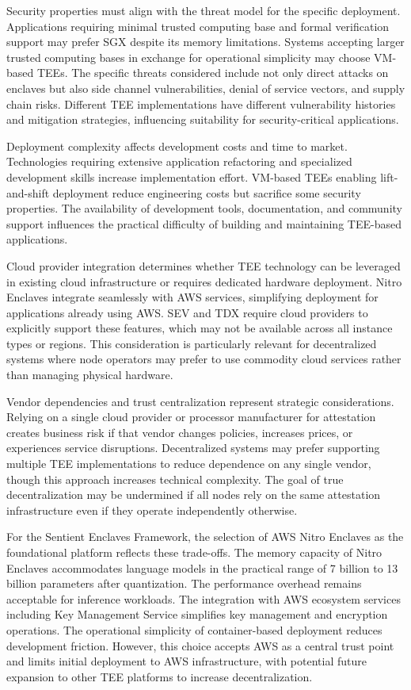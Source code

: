 Security properties must align with the threat model for the specific deployment. Applications requiring minimal trusted computing base and formal verification support may prefer SGX despite its memory limitations. Systems accepting larger trusted computing bases in exchange for operational simplicity may choose VM-based TEEs. The specific threats considered include not only direct attacks on enclaves but also side channel vulnerabilities, denial of service vectors, and supply chain risks. Different TEE implementations have different vulnerability histories and mitigation strategies, influencing suitability for security-critical applications.

Deployment complexity affects development costs and time to market. Technologies requiring extensive application refactoring and specialized development skills increase implementation effort. VM-based TEEs enabling lift-and-shift deployment reduce engineering costs but sacrifice some security properties. The availability of development tools, documentation, and community support influences the practical difficulty of building and maintaining TEE-based applications.

Cloud provider integration determines whether TEE technology can be leveraged in existing cloud infrastructure or requires dedicated hardware deployment. Nitro Enclaves integrate seamlessly with AWS services, simplifying deployment for applications already using AWS. SEV and TDX require cloud providers to explicitly support these features, which may not be available across all instance types or regions. This consideration is particularly relevant for decentralized systems where node operators may prefer to use commodity cloud services rather than managing physical hardware.

Vendor dependencies and trust centralization represent strategic considerations. Relying on a single cloud provider or processor manufacturer for attestation creates business risk if that vendor changes policies, increases prices, or experiences service disruptions. Decentralized systems may prefer supporting multiple TEE implementations to reduce dependence on any single vendor, though this approach increases technical complexity. The goal of true decentralization may be undermined if all nodes rely on the same attestation infrastructure even if they operate independently otherwise.

For the Sentient Enclaves Framework, the selection of AWS Nitro Enclaves as the foundational platform reflects these trade-offs. The memory capacity of Nitro Enclaves accommodates language models in the practical range of 7 billion to 13 billion parameters after quantization. The performance overhead remains acceptable for inference workloads. The integration with AWS ecosystem services including Key Management Service simplifies key management and encryption operations. The operational simplicity of container-based deployment reduces development friction. However, this choice accepts AWS as a central trust point and limits initial deployment to AWS infrastructure, with potential future expansion to other TEE platforms to increase decentralization.